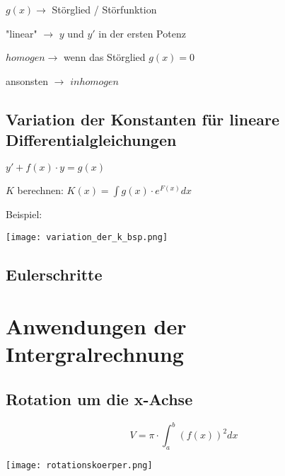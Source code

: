\begin{multicols*}{3}
    {$g(x) \rightarrow$ Störglied / Störfunktion}

    { "linear" $\rightarrow$ $y$ und $y'$ in der ersten Potenz}

    { $homogen \rightarrow$ wenn das Störglied  $g(x)=0$}

    { ansonsten $\rightarrow$ $inhomogen$}

    \subsection{ Variation der Konstanten für lineare Differentialgleichungen}


    {       $y' + f(x) \cdot y = g(x)$}



     {$K$ berechnen: \large $K(x) = \int g(x) \cdot e^{F(x)} dx $}





    {Beispiel:}

    \texttt{[image: variation\_der\_k\_bsp.png]}




    \subsection{ Eulerschritte}

    \section{Anwendungen der Intergralrechnung}
    \subsection{Rotation um die x-Achse}

    \begin{multicols}{2}

        {$$V = \pi \cdot \int_{a}^{b}(f(x))^2dx$$}

        \columnbreak
        \texttt{[image: rotationskoerper.png]}
    \end{multicols}



\end{multicols*}
